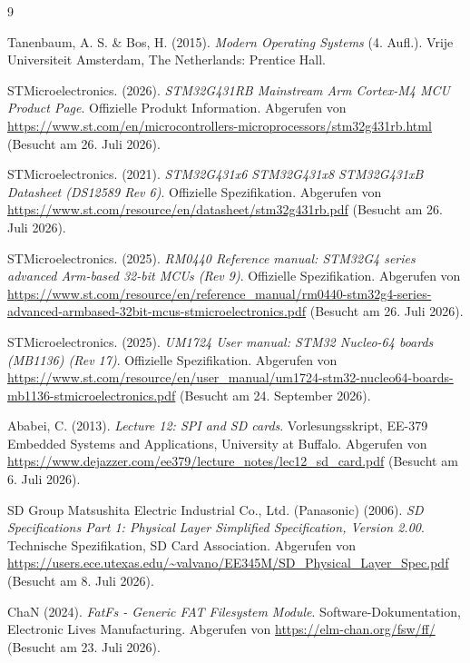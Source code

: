 
\renewcommand{\refname}{Quellenverzeichnis} %
\begin{thebibliography}{9}

Tanenbaum, A. S. \& Bos, H. (2015). 
\textit{Modern Operating Systems} (4. Aufl.). 
Vrije Universiteit Amsterdam, The Netherlands: Prentice Hall.

 STMicroelectronics. (2026). 
\textit{STM32G431RB Mainstream Arm Cortex-M4 MCU Product Page}. 
Offizielle Produkt Information. 
Abgerufen von \url{https://www.st.com/en/microcontrollers-microprocessors/stm32g431rb.html} 
(Besucht am 26. Juli 2026).

 STMicroelectronics. (2021). 
\textit{STM32G431x6 STM32G431x8 STM32G431xB Datasheet (DS12589 Rev 6)}. 
Offizielle Spezifikation. 
Abgerufen von \url{https://www.st.com/resource/en/datasheet/stm32g431rb.pdf} 
(Besucht am 26. Juli 2026).

 STMicroelectronics. (2025). 
\textit{RM0440 Reference manual: STM32G4 series advanced Arm-based 32-bit MCUs (Rev 9)}. 
Offizielle Spezifikation. 
Abgerufen von \url{https://www.st.com/resource/en/reference_manual/rm0440-stm32g4-series-advanced-armbased-32bit-mcus-stmicroelectronics.pdf} 
(Besucht am 26. Juli 2026).

 STMicroelectronics. (2025). 
\textit{UM1724 User manual: STM32 Nucleo-64 boards (MB1136) (Rev 17)}. 
Offizielle Spezifikation. 
Abgerufen von \url{https://www.st.com/resource/en/user_manual/um1724-stm32-nucleo64-boards-mb1136-stmicroelectronics.pdf} 
(Besucht am 24. September 2026).

Ababei, C. (2013). 
\textit{Lecture 12: SPI and SD cards}. 
Vorlesungsskript, EE-379 Embedded Systems and Applications, University at Buffalo. 
Abgerufen von \url{https://www.dejazzer.com/ee379/lecture_notes/lec12_sd_card.pdf} 
(Besucht am 6. Juli 2026).

SD Group
Matsushita Electric Industrial Co., Ltd. (Panasonic)  (2006). 
\textit{SD Specifications Part 1: Physical Layer Simplified Specification, Version 2.00}. 
Technische Spezifikation, SD Card Association. 
Abgerufen von \url{https://users.ece.utexas.edu/~valvano/EE345M/SD_Physical_Layer_Spec.pdf} 
(Besucht am 8. Juli 2026).

 ChaN (2024).  
\textit{FatFs - Generic FAT Filesystem Module}.
Software-Dokumentation, Electronic Lives Manufacturing.
Abgerufen von \url{https://elm-chan.org/fsw/ff/}  
(Besucht am 23. Juli 2026).


\end{thebibliography}
